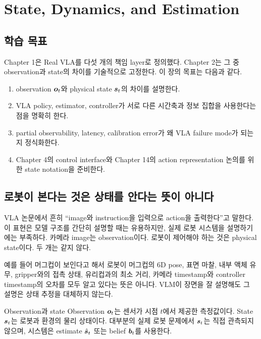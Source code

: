 \chapter{State, Dynamics, and Estimation}

\section*{학습 목표}
Chapter 1은 Real VLA를 다섯 개의 책임 layer로 정의했다. Chapter 2는 그 중 observation과 state의 차이를 기술적으로 고정한다. 이 장의 목표는 다음과 같다.

\begin{enumerate}
  \item observation $\bm{o}_t$와 physical state $\bm{s}_t$의 차이를 설명한다.
  \item VLA policy, estimator, controller가 서로 다른 시간축과 정보 집합을 사용한다는 점을 명확히 한다.
  \item partial observability, latency, calibration error가 왜 VLA failure mode가 되는지 정식화한다.
  \item Chapter 4의 control interface와 Chapter 14의 action representation 논의를 위한 state notation을 준비한다.
\end{enumerate}

\section{로봇이 본다는 것은 상태를 안다는 뜻이 아니다}

VLA 논문에서 흔히 ``image와 instruction을 입력으로 action을 출력한다''고 말한다. 이 표현은 모델 구조를 간단히 설명할 때는 유용하지만, 실제 로봇 시스템을 설명하기에는 부족하다. 카메라 image는 observation이다. 로봇이 제어해야 하는 것은 physical state이다. 두 개는 같지 않다.

예를 들어 머그컵이 보인다고 해서 로봇이 머그컵의 6D pose, 표면 마찰, 내부 액체 유무, gripper와의 접촉 상태, 유리컵과의 최소 거리, 카메라 timestamp와 controller timestamp의 오차를 모두 알고 있다는 뜻은 아니다. VLM이 장면을 잘 설명해도 그 설명은 상태 추정을 대체하지 않는다.

\begin{definitionbox}{Observation과 state}
Observation $\bm{o}_t$는 센서가 시점 $t$에서 제공한 측정값이다. State $\bm{s}_t$는 로봇과 환경의 물리 상태이다. 대부분의 실제 로봇 문제에서 $\bm{s}_t$는 직접 관측되지 않으며, 시스템은 estimate $\hat{\bm{s}}_t$ 또는 belief $\bm{b}_t$를 사용한다.
\end{definitionbox}

